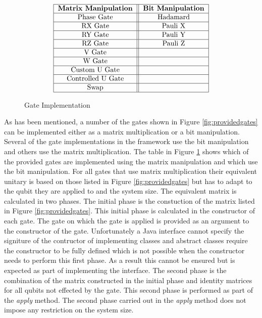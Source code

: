 \begin{figure}
\[
\begin{tabular}{ | c || c | }
\hline
\textbf{Matrix Manipulation} & \textbf{Bit Manipulation} \\ \hline
Phase Gate & Hadamard \\ \hline
RX Gate & Pauli X \\ \hline
RY Gate & Pauli Y \\ \hline
RZ Gate & Pauli Z \\ \hline
V Gate & \\ \hline
W Gate & \\ \hline
Custom U Gate & \\ \hline
Controlled U Gate & \\ \hline
Swap & \\ \hline
\end{tabular}
\]
\caption{Gate Implementation}
\label{fig:gateimps}
\end{figure}

As has been mentioned, a number of the gates shown in Figure \ref{fig:providedgates} can be implemented either as a matrix multiplication or a bit manipulation.
Several of the gate implementations in the framework use the bit manipulation and others use the matrix multiplication.
The table in Figure \ref{fig:gateimps} shows which of the provided gates are implemented using the matrix manipulation and which use the bit manipulation.
For all gates that use matrix multiplication their equivalent unitary is based on those listed in Figure \ref{fig:providedgates} but has to adapt to the qubit they are applied to and the system size.
The equivalent matrix is calculated in two phases.
The initial phase is the constuction of the matrix listed in Figure \ref{fig:providedgates}.
This initial phase is calculated in the constructor of each gate.
The gate on which the gate is applied is provided as an argument to the constructor of the gate.
Unfortunately a Java interface cannot specify the signiture of the contructor of implementing classes and abstract classes require the constructor to be fully defined which is not possible when the constructor needs to perform this first phase.
As a result this cannot be ensured but is expected as part of implementing the interface.
The second phase is the combination of the matrix constructed in the initial phase and identity matrices for all qubits not effected by the gate.
This second phase is performed as part of the \emph{apply} method.
The second phase carried out in the \emph{apply} method does not impose any restriction on the system size.

